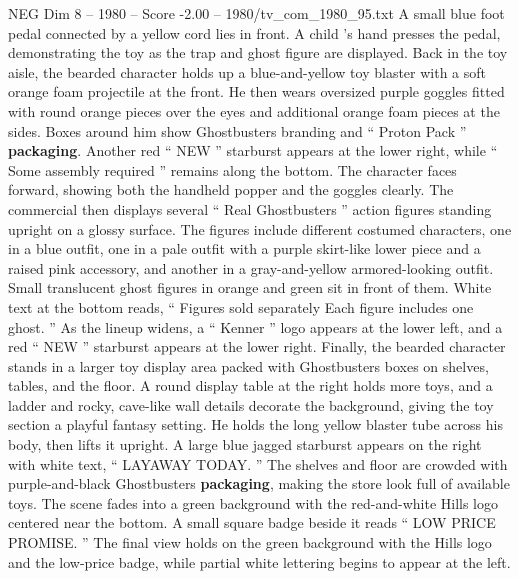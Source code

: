 \begin{textsample}{NEG Dim 8 – 1980 – Score -2.00 – 1980/tv\_com\_1980\_95.txt}
A small blue foot pedal connected by a yellow cord lies in front.
A child ’s hand presses the pedal, demonstrating the toy as the trap and ghost figure are displayed.
Back in the toy aisle, the bearded character holds up a blue-and-yellow toy blaster with a soft orange foam projectile at the front.
He then wears oversized purple goggles fitted with round orange pieces over the eyes and additional orange foam pieces at the sides.
Boxes around him show Ghostbusters branding and “ Proton Pack ” \textbf{packaging}.
Another red “ NEW ” starburst appears at the lower right, while “ Some assembly required ” remains along the bottom.
The character faces forward, showing both the handheld popper and the goggles clearly.
The commercial then displays several “ Real Ghostbusters ” action figures standing upright on a glossy surface.
The figures include different costumed characters, one in a blue outfit, one in a pale outfit with a purple skirt-like lower piece and a raised pink accessory, and another in a gray-and-yellow armored-looking outfit.
Small translucent ghost figures in orange and green sit in front of them.
White text at the bottom reads, “ Figures sold separately Each figure includes one ghost. ” As the lineup widens, a “ Kenner ” logo appears at the lower left, and a red “ NEW ” starburst appears at the lower right.
Finally, the bearded character stands in a larger toy display area packed with Ghostbusters boxes on shelves, tables, and the floor.
A round display table at the right holds more toys, and a ladder and rocky, cave-like wall details decorate the background, giving the toy section a playful fantasy setting.
He holds the long yellow blaster tube across his body, then lifts it upright.
A large blue jagged starburst appears on the right with white text, “ LAYAWAY TODAY. ” The shelves and floor are crowded with purple-and-black Ghostbusters \textbf{packaging}, making the store look full of available toys.
The scene fades into a green background with the red-and-white Hills logo centered near the bottom.
A small square badge beside it reads “ LOW PRICE PROMISE. ” The final view holds on the green background with the Hills logo and the low-price badge, while partial white lettering begins to appear at the left.

\end{textsample}
